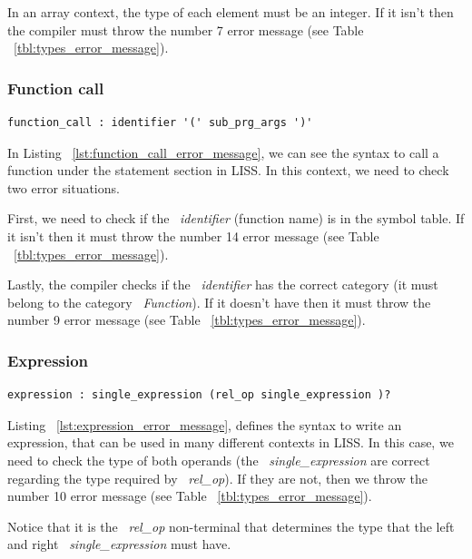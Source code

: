 \documentclass[
  oneside,
  11pt, a4paper,
  footinclude=true,
  headinclude=true,
  cleardoublepage=empty
]{scrbook}
\begin{document}
In an array context, the type of each element must be an integer. If it isn't then the compiler must throw the number 7 error message (see Table ~\ref{tbl:types_error_message}).

\subsubsection{Function call}

\begin{lstlisting}[caption={Function\_call rule in LISS},label={lst:function_call_error_message}]
  function_call : identifier '(' sub_prg_args ')'
\end{lstlisting}

In Listing ~\ref{lst:function_call_error_message}, we can see the syntax to call a function under the statement section in LISS.
In this context, we need to check two error situations.

First, we need to check if the ~\textit{identifier} (function name) is in the symbol table. If it isn't then it must throw the number 14 error message (see Table ~\ref{tbl:types_error_message}).

Lastly, the compiler checks if the ~\textit{identifier} has the correct category (it must belong to the category ~\textit{Function}). If it doesn't have then it must throw the number 9 error message (see Table ~\ref{tbl:types_error_message}).

\subsubsection{Expression}

\begin{lstlisting}[caption={Expression rule in LISS}, label={lst:expression_error_message}]
  expression : single_expression (rel_op single_expression )?
\end{lstlisting}

Listing ~\ref{lst:expression_error_message}, defines the syntax to write an expression, that can be used in many different contexts in LISS. 
In this case, we need to check the type of both  operands (the ~\textit{single\_expression} are correct regarding the type required by ~\textit{rel\_op}). If they are not, then we throw the number 10 error message (see Table ~\ref{tbl:types_error_message}). 

Notice that it is the ~\textit{rel\_op} non-terminal that determines the type that the left and right ~\textit{single\_expression} must have.
\end{document}
